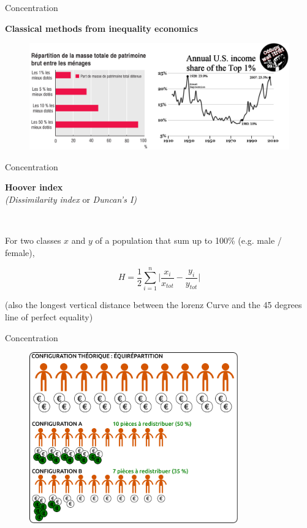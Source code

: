 \begin{frame}{Concentration}

\textbf{Classical methods from inequality economics}

\begin{figure}
\includegraphics[width=12cm]{Inequalities.jpg}
\end{figure}

\end{frame}


\begin{frame}{Concentration}

\textbf{Hoover  index} \\
\emph{(Dissimilarity index} or \emph{Duncan's I)}

~

For two classes $x$ and $y$ of a population  that sum up to 100\% (e.g. male / female), 

\begin{equation}
\nonumber
H = \frac{1}{2} \sum_{i=1}^n \bigg| \frac{x_i}{x_{tot}} - \frac{y_i}{y_{tot}} \bigg|
\end{equation}


(also the longest vertical distance between the lorenz Curve and the 45 degrees line of perfect equality)

\end{frame}


\begin{frame}{Concentration}
\begin{figure}
\includegraphics[width=9cm]{Gateau2.pdf}
\end{figure}

\end{frame}




